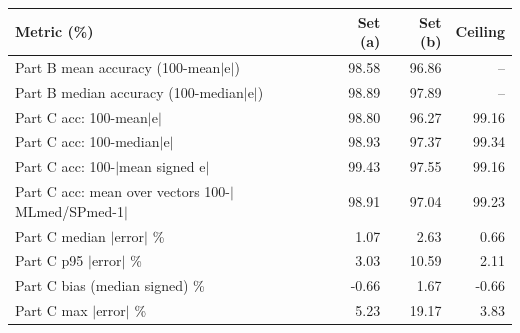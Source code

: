 \begin{tabular}{lrrr}
\toprule
Metric (\%) & Set (a) & Set (b) & Ceiling \\
\midrule
Part B mean accuracy (100-mean$|$e$|$) & 98.58 & 96.86 & -- \\
Part B median accuracy (100-median$|$e$|$) & 98.89 & 97.89 & -- \\
\midrule
Part C acc: 100-mean$|$e$|$ & 98.80 & 96.27 & 99.16 \\
Part C acc: 100-median$|$e$|$ & 98.93 & 97.37 & 99.34 \\
Part C acc: 100-$|$mean signed e$|$ & 99.43 & 97.55 & 99.16 \\
Part C acc: mean over vectors 100-$|$MLmed/SPmed-1$|$ & 98.91 & 97.04 & 99.23 \\
Part C median $|$error$|$ \% & 1.07 & 2.63 & 0.66 \\
Part C p95 $|$error$|$ \% & 3.03 & 10.59 & 2.11 \\
Part C bias (median signed) \% & -0.66 & 1.67 & -0.66 \\
Part C max $|$error$|$ \% & 5.23 & 19.17 & 3.83 \\
\bottomrule
\end{tabular}

